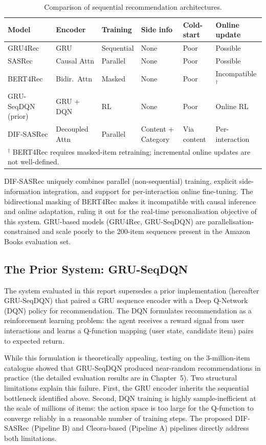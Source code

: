 \begin{table}[H]
\centering
\caption{Comparison of sequential recommendation architectures.}
\label{tab:seq_model_comparison}
\begin{tabular}{p{2.6cm} p{1.7cm} p{1.8cm} p{2.0cm} p{2.0cm} p{2.2cm}}
\hline
\textbf{Model} & \textbf{Encoder} & \textbf{Training} & \textbf{Side info} & \textbf{Cold-start} & \textbf{Online update} \\
\hline
GRU4Rec  & GRU            & Sequential & None    & Poor   & Possible \\
SASRec       & Causal Attn    & Parallel   & None    & Poor   & Possible \\
BERT4Rec    & Bidir.\ Attn   & Masked     & None    & Poor   & Incompatible$^\dagger$ \\
GRU-SeqDQN (prior)                  & GRU + DQN      & RL         & None    & Poor   & Online RL \\
DIF-SASRec & Decoupled Attn & Parallel   & Content + Category & Via content & Per-interaction \\
\hline
\multicolumn{6}{l}{\footnotesize $^\dagger$ BERT4Rec requires masked-item retraining; incremental online updates are not well-defined.} \\
\end{tabular}
\end{table}

DIF-SASRec uniquely combines parallel (non-sequential) training, explicit side-information integration, and support for per-interaction online fine-tuning.
The bidirectional masking of BERT4Rec makes it incompatible with causal inference and online adaptation, ruling it out for the real-time personalisation objective of this system.
GRU-based models (GRU4Rec, GRU-SeqDQN) are parallelisation-constrained and scale poorly to the 200-item sequences present in the Amazon Books evaluation set.

\subsection{The Prior System: GRU-SeqDQN}

The system evaluated in this report supersedes a prior implementation (hereafter GRU-SeqDQN) that paired a GRU sequence encoder with a Deep Q-Network (DQN) policy for recommendation.
The DQN formulates recommendation as a reinforcement learning problem: the agent receives a reward signal from user interactions and learns a Q-function mapping (user state, candidate item) pairs to expected return.

While this formulation is theoretically appealing, testing on the 3-million-item catalogue showed that GRU-SeqDQN produced near-random recommendations in practice (the detailed evaluation results are in Chapter~5).
Two structural limitations explain this failure.
First, the GRU encoder inherits the sequential bottleneck identified above.
Second, DQN training is highly sample-inefficient at the scale of millions of items: the action space is too large for the Q-function to converge reliably in a reasonable number of training steps.
The proposed DIF-SASRec (Pipeline B) and Cleora-based (Pipeline A) pipelines directly address both limitations.

